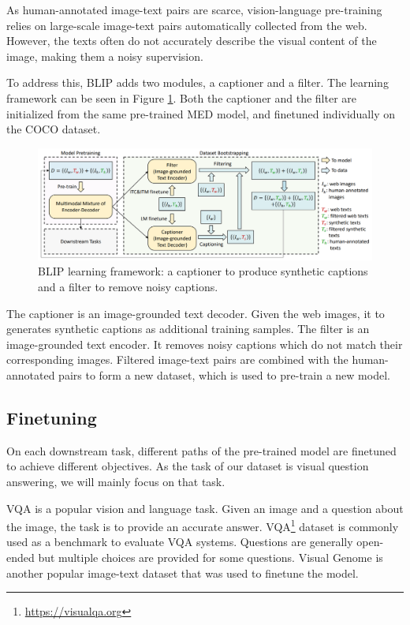 \documentclass[11pt]{article}
\begin{document}
As human-annotated image-text pairs are scarce, vision-language pre-training relies on large-scale image-text pairs automatically collected from the web. However, the texts often do not accurately describe the visual content of the image, making them a noisy supervision. 

To address this, BLIP adds two modules, a captioner and a filter. The learning framework can be seen in Figure \ref{fig:blip_framework}. Both the captioner and the filter are initialized from the same pre-trained MED model, and finetuned individually on the COCO \cite{lin2014microsoft} dataset.

\begin{figure}[ht]
    \centering
    \includegraphics[width=\linewidth]{blip_framework.png}
    \caption{BLIP learning framework: a captioner to produce synthetic captions and a filter to remove noisy captions.}
    \label{fig:blip_framework}
\end{figure}

The captioner is an image-grounded text decoder. Given the web images, it to generates synthetic captions as additional training samples. The filter is an image-grounded text encoder. It removes noisy captions which do not match their corresponding images. Filtered image-text pairs are combined with the human-annotated pairs to form a new dataset, which is used to pre-train a new model.

\subsection{Finetuning}

On each downstream task, different paths of the pre-trained model are finetuned to achieve different objectives. As the task of our dataset is visual question answering, we will mainly focus on that task.

VQA \cite{antol2015vqa} is a popular vision and language task. Given an image and a question about the image, the task is to provide an accurate answer. VQA\footnote{\url{https://visualqa.org}} dataset is commonly used as a benchmark to evaluate VQA systems. Questions are generally open-ended but multiple choices are provided for some questions. Visual Genome \cite{krishna2017visual} is another popular image-text dataset that was used to finetune the model.
\end{document}
